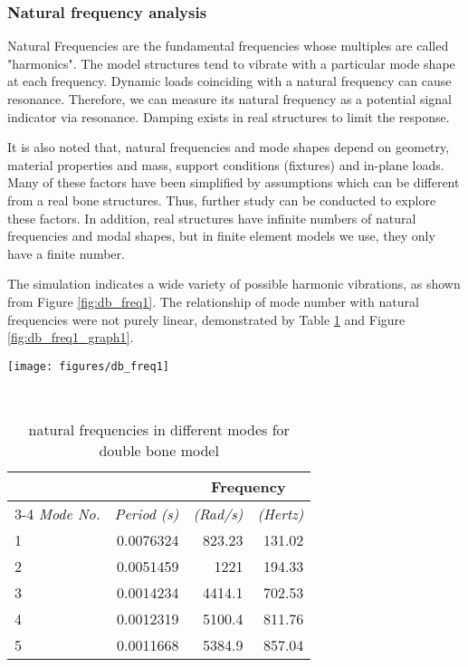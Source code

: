 \documentclass{sigchi}
\begin{document}
\subsubsection{Natural frequency analysis}

Natural Frequencies are the fundamental frequencies whose multiples are called "harmonics". The model structures tend to vibrate with a particular mode shape at each frequency. Dynamic loads coinciding with a natural frequency can cause resonance. Therefore, we can measure its natural frequency as a potential signal indicator via resonance. Damping exists in real structures to limit the response.

It is also noted that, natural frequencies and mode shapes depend on geometry, material properties and mass, support conditions (fixtures) and in-plane loads. Many of these factors have been simplified by assumptions which can be different from a real bone structures. Thus, further study can be conducted to explore these factors. In addition, real structures have infinite numbers of natural frequencies and modal shapes, but in finite element models we use, they only have a finite number.

The simulation indicates a wide variety of possible harmonic vibrations, as shown from Figure \ref{fig:db_freq1}. The relationship of mode number with natural frequencies were not purely linear, demonstrated by Table \ref{tab:db_freq} and Figure \ref{fig:db_freq1_graph1}.

\begin{figure*}
  \centering
  \texttt{[image: figures/db\_freq1]}
  \caption{natural frequency analysis for double bone}
    ~\label{fig:db_freq1}
\end{figure*}

\begin{table}
  \centering
  \begin{tabular}{l r r r}
    & & \multicolumn{2}{c}{\small{\textbf{Frequency}}} \\
    \cmidrule(r){3-4}
    {\small\textit{Mode No.}}
    & {\small \textit{Period (s)}}
      & {\small \textit{(Rad/s)}}
    & {\small \textit{(Hertz)}} \\
    \midrule
    1 & 0.0076324 & 823.23 & 131.02 \\
    2 & 0.0051459 & 1221 & 194.33 \\
    3 & 0.0014234 & 4414.1 & 702.53 \\
    4 & 0.0012319 & 5100.4 & 811.76 \\
    5 & 0.0011668 & 5384.9 & 857.04 \\
  \end{tabular}
  \caption{natural frequencies in different modes for double bone model}~\label{tab:db_freq}
\end{table}
\end{document}
